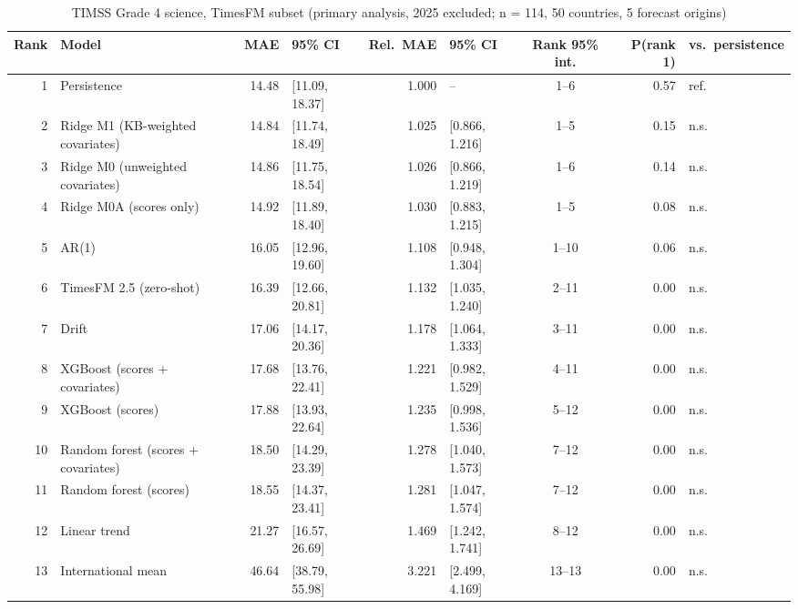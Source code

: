 \begin{table}[htbp]
\centering
\footnotesize
\caption{TIMSS Grade 4 science, TimesFM subset (primary analysis, 2025 excluded; n = 114, 50 countries, 5 forecast origins)}
\label{tab:A16}
\begin{tabular}{rlrlrlcrl}
\toprule
Rank & Model & MAE & 95\% CI & Rel.\ MAE & 95\% CI & Rank 95\% int. & P(rank 1) & vs.\ persistence \\
\midrule
1 & Persistence & 14.48 & [11.09, 18.37] & 1.000 & -- & 1--6 & 0.57 & ref. \\
2 & Ridge M1 (KB-weighted covariates) & 14.84 & [11.74, 18.49] & 1.025 & [0.866, 1.216] & 1--5 & 0.15 & n.s. \\
3 & Ridge M0 (unweighted covariates) & 14.86 & [11.75, 18.54] & 1.026 & [0.866, 1.219] & 1--6 & 0.14 & n.s. \\
4 & Ridge M0A (scores only) & 14.92 & [11.89, 18.40] & 1.030 & [0.883, 1.215] & 1--5 & 0.08 & n.s. \\
5 & AR(1) & 16.05 & [12.96, 19.60] & 1.108 & [0.948, 1.304] & 1--10 & 0.06 & n.s. \\
6 & TimesFM 2.5 (zero-shot) & 16.39 & [12.66, 20.81] & 1.132 & [1.035, 1.240] & 2--11 & 0.00 & n.s. \\
7 & Drift & 17.06 & [14.17, 20.36] & 1.178 & [1.064, 1.333] & 3--11 & 0.00 & n.s. \\
8 & XGBoost (scores + covariates) & 17.68 & [13.76, 22.41] & 1.221 & [0.982, 1.529] & 4--11 & 0.00 & n.s. \\
9 & XGBoost (scores) & 17.88 & [13.93, 22.64] & 1.235 & [0.998, 1.536] & 5--12 & 0.00 & n.s. \\
10 & Random forest (scores + covariates) & 18.50 & [14.29, 23.39] & 1.278 & [1.040, 1.573] & 7--12 & 0.00 & n.s. \\
11 & Random forest (scores) & 18.55 & [14.37, 23.41] & 1.281 & [1.047, 1.574] & 7--12 & 0.00 & n.s. \\
12 & Linear trend & 21.27 & [16.57, 26.69] & 1.469 & [1.242, 1.741] & 8--12 & 0.00 & n.s. \\
13 & International mean & 46.64 & [38.79, 55.98] & 3.221 & [2.499, 4.169] & 13--13 & 0.00 & n.s. \\
\bottomrule
\end{tabular}
\par{}
\end{table}
